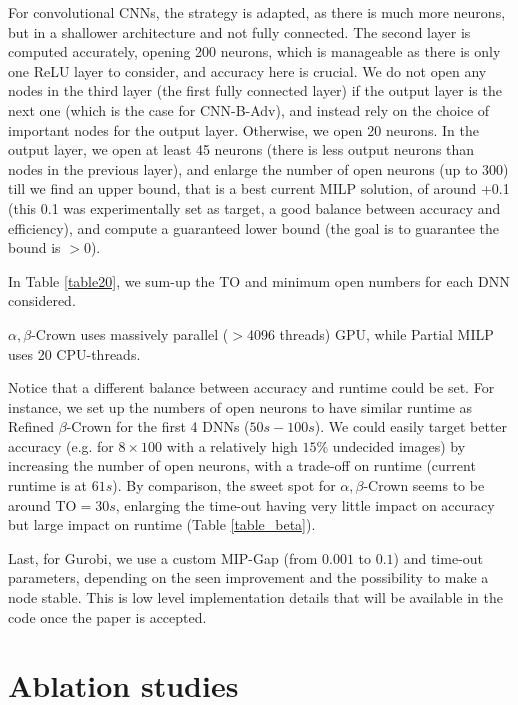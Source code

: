 For convolutional CNNs, the strategy is adapted, as there is much more neurons, but in a shallower architecture and not fully connected. 
The second layer is computed accurately, opening 200 neurons, which is manageable as there is only one ReLU layer to consider, and accuracy here is crucial.
We do not open any nodes in the third layer (the first fully connected layer) if the output layer is the next one (which is the case for CNN-B-Adv), and instead rely on the choice of important nodes for the output layer. Otherwise, we open 20 neurons.
In the output layer, we open at least 45 neurons (there is less output neurons than nodes in the previous layer), and enlarge the number of open neurons (up to 300) till we find an upper bound, that is a best current MILP solution, of around +0.1 (this 0.1 was experimentally set as target, a good balance between accuracy and efficiency), and compute a guaranteed lower bound (the goal is to guarantee the bound is $>0$).

In Table \ref{table20}, we sum-up the TO and minimum open numbers for each DNN considered.


$\alpha,\beta$-Crown uses massively parallel ($>$4096 threads) GPU, while Partial MILP uses 20 CPU-threads.

Notice that a different balance between accuracy and runtime could be set. For instance, we set up the numbers of open neurons to have similar runtime as Refined $\beta$-Crown for the first 4 DNNs ($50s-100s$). We could easily target better accuracy (e.g. for $8 \times 100$ with a relatively high $15\%$ undecided images) by increasing the number of open neurons, with a trade-off on runtime (current runtime is at $61s$).
By comparison, the sweet spot for $\alpha,\beta$-Crown seems to be around TO$=30s$, enlarging the time-out having very little impact on accuracy but large impact on runtime
(Table \ref{table_beta}).



Last, for Gurobi, we use a custom MIP-Gap (from $0.001$ to $0.1$) and time-out parameters, depending on the seen improvement and the possibility to make a node stable. This is low level implementation details that will be available in the code once the paper is accepted.












\section{Ablation studies}	

